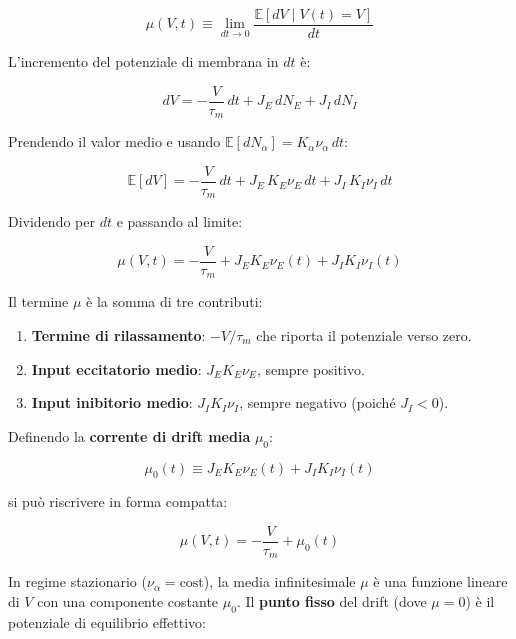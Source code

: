 \begin{equation}
\mu(V, t) \equiv \lim_{dt \to 0} \frac{\mathbb{E}[dV \mid V(t) = V]}{dt}
\end{equation}

L'incremento del potenziale di membrana in $dt$ è:

\begin{equation}
dV = -\frac{V}{\tau_m}\, dt + J_E\, dN_E + J_I\, dN_I
\end{equation}

Prendendo il valor medio e usando $\mathbb{E}[dN_\alpha] = K_\alpha \nu_\alpha\, dt$:

\begin{equation}
\mathbb{E}[dV] = -\frac{V}{\tau_m}\, dt + J_E\, K_E \nu_E\, dt + J_I\, K_I \nu_I\, dt
\end{equation}

Dividendo per $dt$ e passando al limite:

\begin{equation}
\mu(V, t) = -\frac{V}{\tau_m} + J_E K_E \nu_E(t) + J_I K_I \nu_I(t)
\end{equation}

Il termine $\mu$ è la somma di tre contributi:
\begin{enumerate}
    \item \textbf{Termine di rilassamento}: $-V/\tau_m$ che riporta il potenziale verso zero.
    \item \textbf{Input eccitatorio medio}: $J_E K_E \nu_E$, sempre positivo.
    \item \textbf{Input inibitorio medio}: $J_I K_I \nu_I$, sempre negativo (poiché $J_I < 0$).
\end{enumerate}

Definendo la \textbf{corrente di drift media} $\mu_0$:

\begin{equation}
\mu_0(t) \equiv J_E K_E \nu_E(t) + J_I K_I \nu_I(t)
\end{equation}

si può riscrivere in forma compatta:

\begin{equation}
\mu(V, t) = -\frac{V}{\tau_m} + \mu_0(t)
\end{equation}

In regime stazionario ($\nu_\alpha = \text{cost}$), la media infinitesimale $\mu$ è una funzione lineare di $V$ con una componente costante $\mu_0$. Il \textbf{punto fisso} del drift (dove $\mu = 0$) è il potenziale di equilibrio effettivo:

